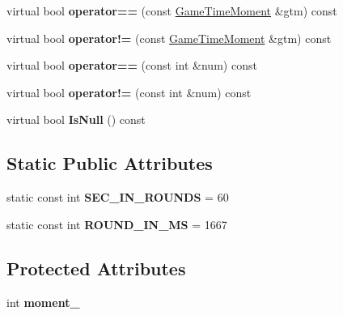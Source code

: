 \begin{DoxyCompactItemize}
\item 
virtual bool {\bfseries operator==} (const \hyperlink{class_game_time_moment}{Game\+Time\+Moment} \&gtm) const \hypertarget{class_game_time_moment_a8ac39c556bc0c162c84ef991c9bfe179}{}\label{class_game_time_moment_a8ac39c556bc0c162c84ef991c9bfe179}

\item 
virtual bool {\bfseries operator!=} (const \hyperlink{class_game_time_moment}{Game\+Time\+Moment} \&gtm) const \hypertarget{class_game_time_moment_a5d8f1b577f3eb1d1390b8a5fde98a0bb}{}\label{class_game_time_moment_a5d8f1b577f3eb1d1390b8a5fde98a0bb}

\item 
virtual bool {\bfseries operator==} (const int \&num) const \hypertarget{class_game_time_moment_a529b0b4899c904c4014ea4d3e2659f2a}{}\label{class_game_time_moment_a529b0b4899c904c4014ea4d3e2659f2a}

\item 
virtual bool {\bfseries operator!=} (const int \&num) const \hypertarget{class_game_time_moment_a24f33057e7e1bc5b394b31fed31b3724}{}\label{class_game_time_moment_a24f33057e7e1bc5b394b31fed31b3724}

\item 
virtual bool {\bfseries Is\+Null} () const \hypertarget{class_game_time_moment_a65c32bc84edd579d8d34fa6039271406}{}\label{class_game_time_moment_a65c32bc84edd579d8d34fa6039271406}

\end{DoxyCompactItemize}
\subsection*{Static Public Attributes}
\begin{DoxyCompactItemize}
\item 
static const int {\bfseries S\+E\+C\+\_\+\+I\+N\+\_\+\+R\+O\+U\+N\+DS} = 60\hypertarget{class_game_time_moment_a1eb50927970868cac5e75476351e3099}{}\label{class_game_time_moment_a1eb50927970868cac5e75476351e3099}

\item 
static const int {\bfseries R\+O\+U\+N\+D\+\_\+\+I\+N\+\_\+\+MS} = 1667\hypertarget{class_game_time_moment_a2a46f74a10bb7f886aae5f7f0cbf098f}{}\label{class_game_time_moment_a2a46f74a10bb7f886aae5f7f0cbf098f}

\end{DoxyCompactItemize}
\subsection*{Protected Attributes}
\begin{DoxyCompactItemize}
\item 
int {\bfseries moment\+\_\+}\hypertarget{class_game_time_moment_ab217110b82c7fd665db8088bb0ca0612}{}\label{class_game_time_moment_ab217110b82c7fd665db8088bb0ca0612}

\end{DoxyCompactItemize}


